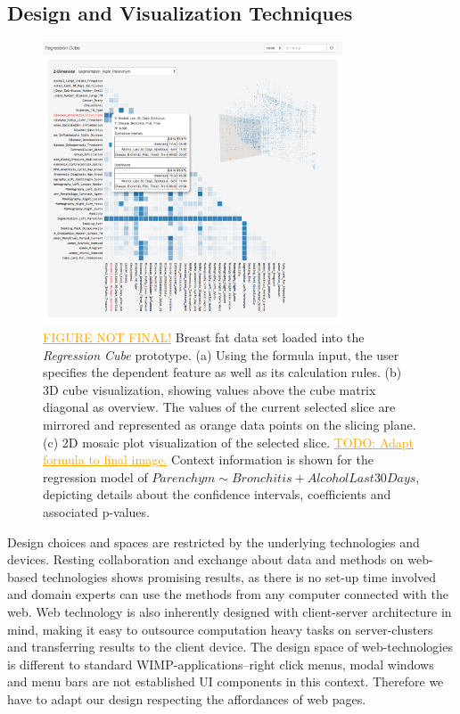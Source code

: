 \documentclass[journal]{style/vgtc} 			          %
\newcommand{\com}[1]{\textcolor{orange}{\uline{#1}}}
\begin{document}
\subsection{Design and Visualization Techniques} \label{Structure and Workflow}
\begin{figure}[htb]
 \centering
 \includegraphics[width=3.5in]{figures/system_sketch}
 \caption{
 \com{FIGURE NOT FINAL!}
 Breast fat data set loaded into the \emph{Regression Cube} prototype.
 (a) Using the formula input, the user specifies the dependent feature as well as its calculation rules.
 (b) 3D cube visualization, showing values above the cube matrix diagonal as overview.
 The values of the current selected slice are mirrored and represented as orange data points on the slicing plane.
 (c) 2D mosaic plot visualization of the selected slice.
 \com{TODO: Adapt formula to final image.}
 Context information is shown for the regression model of $Parenchym \sim Bronchitis + AlcoholLast30Days$, depicting details about the confidence intervals, coefficients and associated p-values.
 }
  \label{fig:System}
\end{figure}
Design choices and spaces are restricted by the underlying technologies and devices.
Resting collaboration and exchange about data and methods on web-based technologies shows promising results, as there is no set-up time involved and domain experts can use the methods from any computer connected with the web.
Web technology is also inherently designed with client-server architecture in mind, making it easy to outsource computation heavy tasks on server-clusters and transferring results to the client device.
The design space of web-technologies is different to standard WIMP-applications--right click menus, modal windows and menu bars are not established UI components in this context.
Therefore we have to adapt our design respecting the affordances of web pages.
\end{document}
